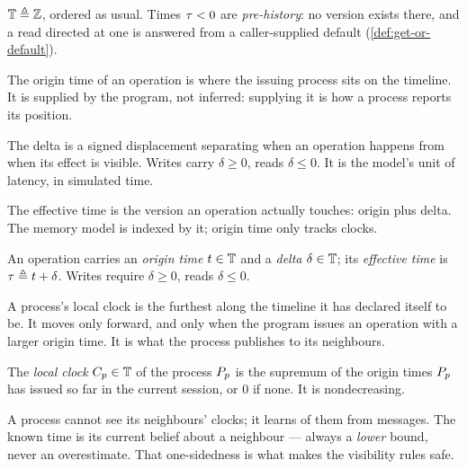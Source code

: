 \begin{definition}\label{def:logical-time}
$\mathbb{T} \triangleq \mathbb{Z}$, ordered as usual. Times $\tau < 0$ are
\emph{pre-history}: no \gls{version} exists there, and a read directed at one
is answered from a caller-supplied default (\cref{def:get-or-default}).
\end{definition}

The origin time of an operation is where the issuing process sits on the
timeline. It is supplied by the program, not inferred: supplying it is how a
process reports its position.

The delta is a signed displacement separating when an operation happens from
when its effect is visible. Writes carry $\delta \ge 0$, reads $\delta \le 0$.
It is the model's unit of latency, in simulated time.

The effective time is the \gls{version} an operation actually touches: origin
plus delta. The memory model is indexed by it; origin time only tracks clocks.

\begin{definition}\label{def:times}
An operation carries an \emph{origin time} $t \in \mathbb{T}$ and a \emph{delta}
$\delta \in \mathbb{T}$; its \emph{effective time} is $\tau \triangleq t + \delta$.
Writes require $\delta \ge 0$, reads $\delta \le 0$.
\end{definition}

A process's local clock is the furthest along the timeline it has declared
itself to be. It moves only forward, and only when the program issues an
operation with a larger origin time. It is what the process publishes to its
neighbours.

\begin{definition}\label{def:local-clock}
The \emph{local clock} $C_{p} \in \mathbb{T}$ of the process $P_{p}$ is the
supremum of the origin times $P_{p}$ has issued so far in the current
\gls{session}, or $0$ if none. It is nondecreasing.
\end{definition}

A process cannot see its neighbours' clocks; it learns of them from messages.
The known time is its current belief about a neighbour --- always a
\emph{lower} bound, never an overestimate. That one-sidedness is what makes
the visibility rules safe.

